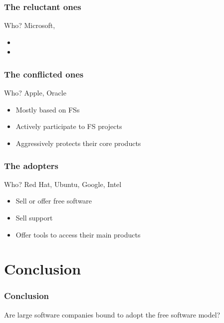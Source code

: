 \documentclass{beamer}
\begin{document}
\begin{frame}

  \frametitle{The reluctant ones}

  \begin{block}{Who?}
    Microsoft,
  \end{block}

  \vfill

  \begin{itemize}
    \item{}
    \item{}
  \end{itemize}

\end{frame}

\begin{frame}

  \frametitle{The conflicted ones}

  \begin{block}{Who?}
    Apple, Oracle
  \end{block}

  \vfill

  \begin{itemize}
    \item{Mostly based on FSs}
    \item{Actively participate to FS projects}
    \item{Aggressively protects their core products}
  \end{itemize}

\end{frame}

\begin{frame}

  \frametitle{The adopters}

  \begin{block}{Who?}
    Red Hat, Ubuntu, Google, Intel
  \end{block}

  \vfill

  \begin{itemize}
    \item{Sell or offer free software}
    \item{Sell support}
    \item{Offer tools to access their main products}
  \end{itemize}

\end{frame}

\section{Conclusion}

\begin{frame}

  \frametitle{Conclusion}

  \begin{block}{}
    \begin{center}Are large software companies bound to adopt the free software
    model?\end{center}
  \end{block}

\end{frame}
\end{document}
